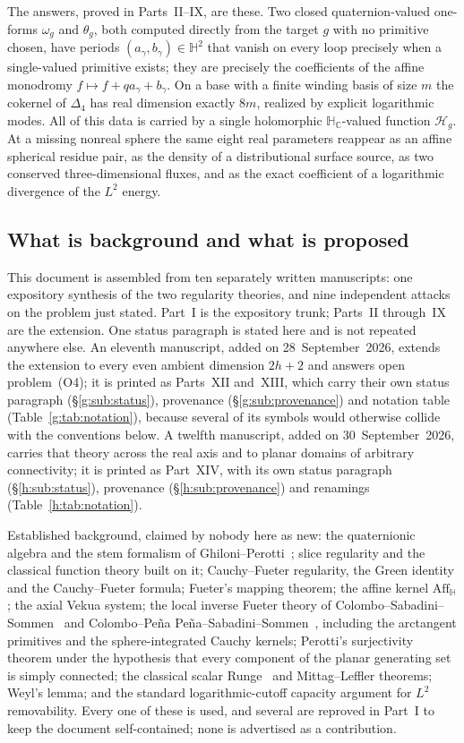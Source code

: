 \documentclass[11pt,a4paper]{article}
\numberwithin{equation}{section}
\theoremstyle{definition}
\theoremstyle{remark}
\theoremstyle{plain}
\newcommand{\HH}{\mathbb H}
\newcommand{\HC}{\mathbb H_{\mathbb C}}
\newcommand{\lap}{\Delta_4}
\newcommand{\Aff}{\mathrm{Aff}_{\HH}}
\newcommand{\om}{\omega}
\newcommand{\thet}{\theta}
\newcommand{\Hg}{\mathcal H_{g}}      %
\begin{document}
The answers, proved in Parts~II--IX, are these. Two closed quaternion-valued
one-forms $\om_g$ and $\thet_g$, both computed directly from the target $g$
with no primitive chosen, have periods $(a_\gamma,b_\gamma)\in\HH^2$ that
vanish on every loop precisely when a single-valued primitive exists; they are
precisely the coefficients of the affine monodromy
$f\mapsto f+qa_\gamma+b_\gamma$. On a base with a finite winding basis of size
$m$ the cokernel of $\lap$ has real dimension exactly $8m$, realized by
explicit logarithmic modes. All of this data is carried by a single
holomorphic $\HC$-valued function $\Hg$. At a missing nonreal sphere the same
eight real parameters reappear as an affine spherical residue pair, as the
density of a distributional surface source, as two conserved three-dimensional
fluxes, and as the exact coefficient of a logarithmic divergence of the
$L^2$ energy.

\subsection{What is background and what is proposed}
\label{a:sec:status}

This document is assembled from ten separately written manuscripts: one
expository synthesis of the two regularity theories, and nine independent
attacks on the problem just stated. Part~I is the expository trunk; Parts~II
through~IX are the extension. One status paragraph is stated here and is not
repeated anywhere else. An eleventh manuscript, added on 28~September~2026,
extends the extension to every even ambient dimension $2h+2$ and answers open
problem~(O4); it is printed as Parts~XII and~XIII, which carry their own
status paragraph (\S\ref{g:sub:status}), provenance
(\S\ref{g:sub:provenance}) and notation table (Table~\ref{g:tab:notation}),
because several of its symbols would otherwise collide with the conventions
below. A twelfth manuscript, added on 30~September~2026, carries that theory
across the real axis and to planar domains of arbitrary connectivity; it is
printed as Part~XIV, with its own status paragraph (\S\ref{h:sub:status}),
provenance (\S\ref{h:sub:provenance}) and renamings
(Table~\ref{h:tab:notation}).

Established background, claimed by nobody here as new: the quaternionic
algebra and the stem formalism of Ghiloni--Perotti~\cite{GP}; slice regularity and the
classical function theory built on it; Cauchy--Fueter regularity, the Green
identity and the Cauchy--Fueter formula; Fueter's mapping theorem; the affine
kernel $\Aff$; the axial Vekua system; the local inverse Fueter theory of
Colombo--Sabadini--Sommen~\cite{CSS} and Colombo--Pe\~na Pe\~na--Sabadini--Sommen~\cite{CPSS},
including the arctangent primitives and the sphere-integrated Cauchy kernels;
Perotti's surjectivity theorem under the hypothesis that every component of
the planar generating set is simply connected; the classical scalar Runge~\cite{Runge} and
Mittag--Leffler theorems; Weyl's lemma; and the standard logarithmic-cutoff
capacity argument for $L^2$ removability. Every one of these is used, and
several are reproved in Part~I to keep the document self-contained; none is
advertised as a contribution.
\end{document}
